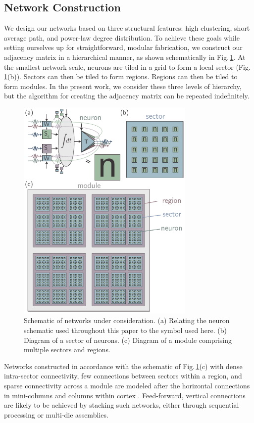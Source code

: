 \documentclass[twocolumn]{article}
\begin{document}
\subsection{\label{sec:networkConstruction}Network Construction}
We design our networks based on three structural features: high clustering, short average path, and power-law degree distribution. To achieve these goals while setting ourselves up for straightforward, modular fabrication, we construct our adjacency matrix in a hierarchical manner, as shown schematically in Fig.\,\ref{fig:networks_schematic}. At the smallest network scale, neurons are tiled in a grid to form a local sector (Fig.\,\ref{fig:networks_schematic}(b)). Sectors can then be tiled to form regions. Regions can then be tiled to form modules. In the present work, we consider these three levels of hierarchy, but the algorithm for creating the adjacency matrix can be repeated indefinitely. 
\begin{figure}[t!]
	\centerline{\includegraphics[width=8.6cm]{_networks_schematic_small.pdf}}
	\caption{\label{fig:networks_schematic}Schematic of networks under consideration. (a) Relating the neuron schematic used throughout this paper to the symbol used here. (b) Diagram of a sector of neurons. (c) Diagram of a module comprising multiple sectors and regions.}
\end{figure}
Networks constructed in accordance with the schematic of Fig.\,\ref{fig:networks_schematic}(c) with dense intra-sector connectivity, few connections between sectors within a region, and sparse connectivity across a module are modeled after the horizontal connections in mini-columns and columns within cortex \cite{mo1997,spto2000,brto2006,haah2017}. Feed-forward, vertical connections are likely to be achieved by stacking such networks, either through sequential processing or multi-die assemblies.
\end{document}
